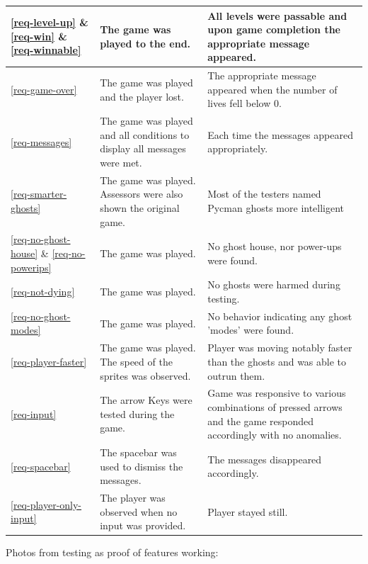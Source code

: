\documentclass[11pt,a4paper,notitlepage]{report}
\begin{document}
\begin{center}
\begin{longtable}{ | p{2cm} | p{5cm} | p{4cm} |}
					\ref{req-level-up} \& \ref{req-win} \& \ref{req-winnable}&The game was played to the end.&All levels were passable and upon game completion the appropriate message appeared.\\ \hline
					\ref{req-game-over}&The game was played and the player lost.&The appropriate message appeared when the number of lives fell below 0.\\ \hline
					\ref{req-messages}&The game was played and all conditions to display all messages were met.&Each time the messages appeared appropriately.\\ \hline
					\ref{req-smarter-ghosts}&The game was played. Assessors were also shown the original game.&Most of the testers named Pycman ghosts more intelligent\\ \hline
					\ref{req-no-ghost-house} \& \ref{req-no-powerips}&The game was played.&No ghost house, nor power-ups were found.\\ \hline
					\ref{req-not-dying}&The game was played.&No ghosts were harmed during testing.\\ \hline
					\ref{req-no-ghost-modes}&The game was played.&No behavior indicating any ghost 'modes' were found.\\ \hline
					\ref{req-player-faster}&The game was played. The speed of the sprites was observed.&Player was moving notably faster than the ghosts and was able to outrun them.\\ \hline
					\ref{req-input}&The arrow Keys were tested during the game.&Game was responsive to various combinations of pressed arrows and the game responded accordingly with no anomalies.\\ \hline
					\ref{req-spacebar}&The spacebar was used to dismiss the messages.&The messages disappeared accordingly.\\ \hline
					\ref{req-player-only-input}&The player was observed when no input was provided.&Player stayed still.\\ \hline
				\end{longtable}
			\end{center}
			Photos from testing as proof of features working:\\
\end{document}
